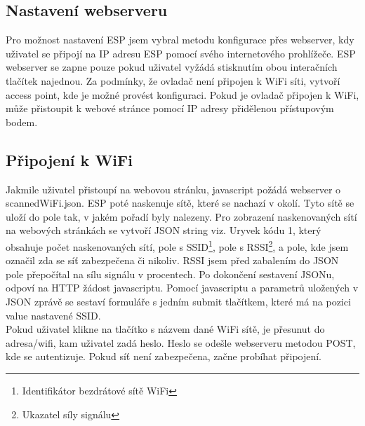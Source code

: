 \documentclass[a4paper, 12pt]{report}
\begin{document}
    \subsection{Nastavení webserveru}
    Pro možnost nastavení ESP jsem vybral metodu konfigurace přes webserver, kdy uživatel se připojí na IP adresu ESP pomocí svého internetového prohlížeče. ESP webserver se zapne pouze pokud uživatel vyžádá stisknutím obou interačních tlačítek najednou. Za podmínky, že ovladač není připojen k WiFi síti, vytvoří access point, kde je možné provést konfiguraci. Pokud je ovladač připojen k WiFi, může přistoupit k webové stránce pomocí IP adresy přidělenou přístupovým bodem.

    \subsection{Připojení k WiFi}
    Jakmile uživatel přistoupí na webovou stránku, javascript požádá webserver o scannedWiFi.json. ESP poté naskenuje sítě, které se nachazí v okolí. Tyto sítě se uloží do pole tak, v jakém pořadí byly nalezeny. Pro zobrazení naskenovaných sítí na webových stránkách se vytvoří JSON string viz. Uryvek kódu 1, který obsahuje počet naskenovaných sítí, pole s SSID\footnote{Identifikátor bezdrátové sítě WiFi}, pole s RSSI\footnote{Ukazatel síly signálu}, a pole, kde jsem označil zda se síť zabezpečena či nikoliv. RSSI jsem před zabalením do JSON pole přepočítal na sílu signálu v procentech. Po dokončení sestavení JSONu, odpoví na HTTP žádost javascriptu. Pomocí javascriptu a parametrů uložených v JSON zprávě se sestaví formuláře s jedním submit tlačítkem, které má na pozici value nastavené SSID.\\
    Pokud uživatel klikne na tlačítko s názvem dané WiFi sítě, je přesunut do adresa/wifi, kam uživatel zadá heslo. Heslo se odešle webserveru metodou POST, kde se autentizuje. Pokud síť není zabezpečena, začne probíhat připojení.
\end{document}
